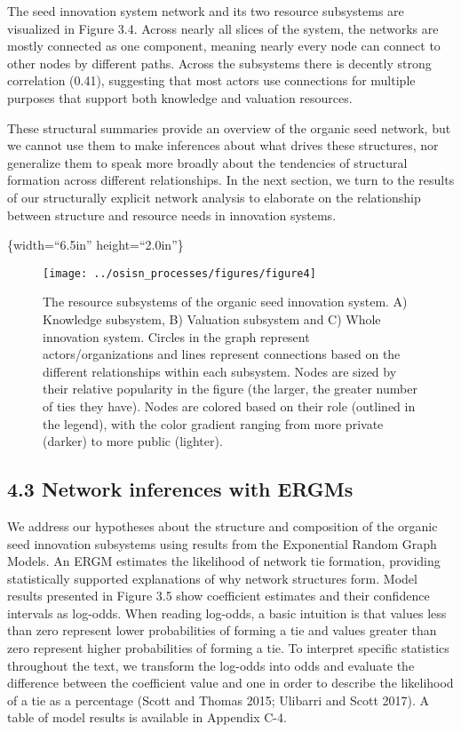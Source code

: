 \documentclass[twoside,12pt,final]{ucthesis-CA2012}
\begin{document}
\begin{ucmainmatter}
The seed innovation system network and its two resource subsystems are
visualized in Figure 3.4. Across nearly all \textquotesingle slices\textquotesingle{} of the system,
the networks are mostly connected as one component, meaning nearly every
node can connect to other nodes by different \textquotesingle paths\textquotesingle. Across the
subsystems there is decently strong correlation (0.41), suggesting that
most actors use connections for multiple purposes that support both
knowledge and valuation resources.

These structural summaries provide an overview of the organic seed
network, but we cannot use them to make inferences about what drives
these structures, nor generalize them to speak more broadly about the
tendencies of structural formation across different relationships. In
the next section, we turn to the results of our structurally explicit
network analysis to elaborate on the relationship between structure and
resource needs in innovation systems.

\{width=``6.5in'' height=``2.0in''\}
\begin{figure}

{\centering \texttt{[image: ../osisn\_processes/figures/figure4]} 

}

\caption{The resource subsystems of the organic seed innovation system. A) Knowledge subsystem, B) Valuation subsystem and C) Whole innovation system. Circles in the graph represent actors/organizations and lines represent connections based on the different relationships within each subsystem. Nodes are sized by their relative popularity in the figure (the larger, the greater number of ties they have). Nodes are colored based on their role (outlined in the legend), with the color gradient ranging from more private (darker) to more public (lighter).  }\label{fig:unnamed-chunk-27}
\end{figure}
\hypertarget{network-inferences-with-ergms}{%
\subsection{4.3 Network inferences with ERGMs}\label{network-inferences-with-ergms}}

We address our hypotheses about the structure and composition of the
organic seed innovation subsystems using results from the Exponential
Random Graph Models. An ERGM estimates the likelihood of network tie
formation, providing statistically supported explanations of why network
structures form. Model results presented in Figure 3.5 show coefficient
estimates and their confidence intervals as log-odds. When reading
log-odds, a basic intuition is that values less than zero represent
lower probabilities of forming a tie and values greater than zero
represent higher probabilities of forming a tie. To interpret specific
statistics throughout the text, we transform the log-odds into odds and
evaluate the difference between the coefficient value and one in order
to describe the likelihood of a tie as a percentage (Scott and Thomas
2015; Ulibarri and Scott 2017). A table of model results is available in
Appendix C-4.


\end{ucmainmatter}
\end{document}
